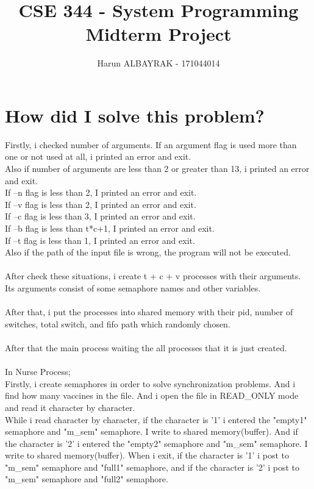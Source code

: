\documentclass[20pt]{article}
\begin{document}
\title{%
  CSE 344 - System Programming \\
  \large Midterm Project}

\author{Harun ALBAYRAK - 171044014}

\maketitle

\Large
\section{How did I solve this problem?}
Firstly, i checked number of arguments. If an argument flag is used more than one or not used at all, i printed an error and exit. \\
Also if number of arguments are less than 2 or greater than 13, i printed an error and exit.\\
If –n flag is less than 2, I printed an error and exit. \\
If –v flag is less than 2, I printed an error and exit. \\
If –c flag is less than 3, I printed an error and exit. \\
If –b flag is less than t*c+1, I printed an error and exit. \\ 
If –t flag is less than 1, I printed an error and exit. \\
Also if the path of the input file is wrong, the program will not be executed.
\\\\
After check these situations, i create t + c + v processes with their arguments. Its arguments consist of some semaphore names and other variables. 
\\\\
After that, i put the processes into shared memory with their pid, number of switches, total switch, and fifo path which randomly chosen. 
\\\\
After that the main process waiting the all processes that it is just created.
\\\\
In Nurse Process; \\
Firstly, i create semaphores in order to solve synchronization problems. And i find how many vaccines in the file. And i open the file in READ\_ONLY mode and read it character by character. \\
While i read character by character, if the character is '1' i entered the "empty1" semaphore and "m\_sem" semaphore. I write to shared memory(buffer). And if the character is '2' i entered the "empty2" semaphore and "m\_sem" semaphore. I write to shared memory(buffer). When i exit, if the character is '1' i post to "m\_sem" semaphore and "full1" semaphore, and if the character is '2' i post to "m\_sem" semaphore and "full2" semaphore.
\end{document}
